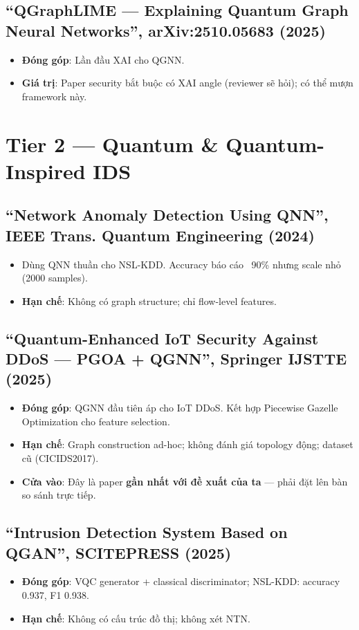 \documentclass[11pt,a4paper]{article}
\begin{document}
\subsection{``QGraphLIME --- Explaining Quantum Graph Neural Networks'', arXiv:2510.05683 (2025)}
\begin{itemize}
  \item \textbf{Đóng góp}: Lần đầu XAI cho QGNN.
  \item \textbf{Giá trị}: Paper security bắt buộc có XAI angle (reviewer sẽ hỏi); có thể mượn framework này.
\end{itemize}

\section{Tier 2 --- Quantum \& Quantum-Inspired IDS}

\subsection{``Network Anomaly Detection Using QNN'', IEEE Trans. Quantum Engineering (2024)}
\begin{itemize}
  \item Dùng QNN thuần cho NSL-KDD. Accuracy báo cáo ~90\% nhưng scale nhỏ (2000 samples).
  \item \textbf{Hạn chế}: Không có graph structure; chỉ flow-level features.
\end{itemize}

\subsection{``Quantum-Enhanced IoT Security Against DDoS --- PGOA + QGNN'', Springer IJSTTE (2025)}
\begin{itemize}
  \item \textbf{Đóng góp}: QGNN đầu tiên áp cho IoT DDoS. Kết hợp Piecewise Gazelle Optimization cho feature selection.
  \item \textbf{Hạn chế}: Graph construction ad-hoc; không đánh giá topology động; dataset cũ (CICIDS2017).
  \item \textbf{Cửa vào}: Đây là paper \textbf{gần nhất với đề xuất của ta} --- phải đặt lên bàn so sánh trực tiếp.
\end{itemize}

\subsection{``Intrusion Detection System Based on QGAN'', SCITEPRESS (2025)}
\begin{itemize}
  \item \textbf{Đóng góp}: VQC generator + classical discriminator; NSL-KDD: accuracy 0.937, F1 0.938.
  \item \textbf{Hạn chế}: Không có cấu trúc đồ thị; không xét NTN.
\end{itemize}
\end{document}
